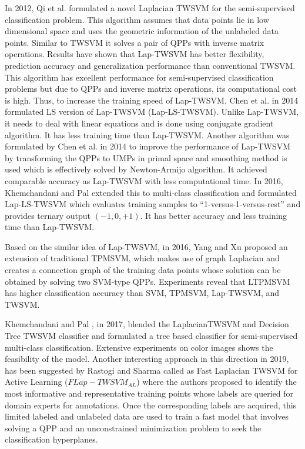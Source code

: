 \documentclass[pdflatex,sn-mathphys]{sn-jnl}%
\theoremstyle{thmstyleone}%
\theoremstyle{thmstyletwo}%
\theoremstyle{thmstylethree}%
\begin{document}
In 2012, Qi et al. \cite{qi2012laplacian} formulated a novel Laplacian \textendash TWSVM for the semi-supervised classification problem. This algorithm assumes that data points lie in low dimensional space and uses the geometric information of the unlabeled data points. Similar to TWSVM it solves a pair of QPPs with inverse matrix operations. Results have shown that Lap-TWSVM has better flexibility, prediction accuracy and generalization performance than conventional TWSVM. This algorithm has excellent performance for semi-supervised classification problems but due to QPPs and inverse matrix operations, its computational cost is high. Thus, to increase the training speed of Lap-TWSVM, Chen et al. \cite{chen2014laplacian} in 2014 formulated LS version of Lap-TWSVM (Lap-LS-TWSVM). Unlike Lap-TWSVM, it needs to deal with linear equations and is done using conjugate gradient algorithm. It has less training time than Lap-TWSVM. Another algorithm was formulated by Chen et al. \cite{chen2014laplacian1} in 2014 to improve the performance of Lap-TWSVM by transforming the QPPs to UMPs in primal space and smoothing method is used which is effectively solved by Newton-Armijo algorithm. It achieved comparable accuracy as Lap-TWSVM with less computational time. In 2016, Khemchandani and Pal \cite{khemchandani2016multi} extended this to multi-class classification and formulated Lap-LS-TWSVM which evaluates training samples to ``1-versus-1-versus-rest'' and provides ternary output $(-1, 0,+1)$. It has better accuracy and less training time than Lap-TWSVM.

Based on the similar idea of Lap-TWSVM, in 2016, Yang and Xu \cite{yang2016laplacian} proposed an extension of traditional TPMSVM, which makes use of graph Laplacian and creates a connection graph of the training data points whose solution can be obtained by solving two SVM-type QPPs. Experiments reveal that LTPMSVM has higher classification accuracy than SVM, TPMSVM, Lap-TWSVM, and TWSVM. 


Khemchandani and Pal \cite{khemchandani2017tree}, in 2017, blended the Laplacian\textendash TWSVM and Decision Tree \textendash TWSVM classifier and formulated a tree based classifier for semi-supervised multi-class classification. Extensive experiments on color images shows the feasibility of the model. Another interesting approach in this direction in 2019, has been suggested by Rastogi and Sharma  \cite{rastogi2019fast} called as Fast Laplacian TWSVM for Active Learning ($FLap-TWSVM_{AL}$) where the authors proposed to identify the most informative and representative training points whose labels are queried for domain experts for annotations. Once the corresponding labels are acquired, this limited labeled and unlabeled data are used to train a fast model that involves solving a QPP and an unconstrained minimization problem to seek the classification hyperplanes. 
\end{document}

